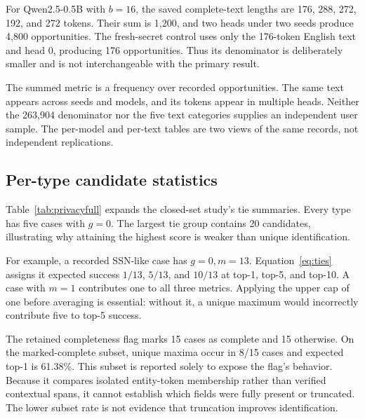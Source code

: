 For Qwen2.5-0.5B with $b=16$, the saved complete-text lengths are 176, 288, 272, 192, and 272 tokens. Their sum is 1,200, and two heads under two seeds produce 4,800 opportunities. The fresh-secret control uses only the 176-token English text and head 0, producing 176 opportunities. Thus its denominator is deliberately smaller and is not interchangeable with the primary result.

The summed metric is a frequency over recorded opportunities. The same text appears across seeds and models, and its tokens appear in multiple heads. Neither the 263,904 denominator nor the five text categories supplies an independent user sample. The per-model and per-text tables are two views of the same records, not independent replications.

\subsection{Per-type candidate statistics}
Table~\ref{tab:privacyfull} expands the closed-set study's tie summaries. Every type has five cases with $g=0$. The largest tie group contains 20 candidates, illustrating why attaining the highest score is weaker than unique identification.

\begin{table}[t]
\centering
\caption{Closed-set cases by type. Top-$k$ percentages use uniform tie-breaking from retained $g,m$ integers. Four equal 25-percentage-point color bands run from green (low) to red (high). Each row contains five cases under one key.}
\label{tab:privacyfull}

\end{table}

For example, a recorded SSN-like case has $g=0,m=13$. Equation~\eqref{eq:ties} assigns it expected success $1/13$, $5/13$, and $10/13$ at top-1, top-5, and top-10. A case with $m=1$ contributes one to all three metrics. Applying the upper cap of one before averaging is essential: without it, a unique maximum would incorrectly contribute five to top-5 success.

The retained completeness flag marks 15 cases as complete and 15 otherwise. On the marked-complete subset, unique maxima occur in 8/15 cases and expected top-1 is 61.38\%. This subset is reported solely to expose the flag's behavior. Because it compares isolated entity-token membership rather than verified contextual spans, it cannot establish which fields were fully present or truncated. The lower subset rate is not evidence that truncation improves identification.

